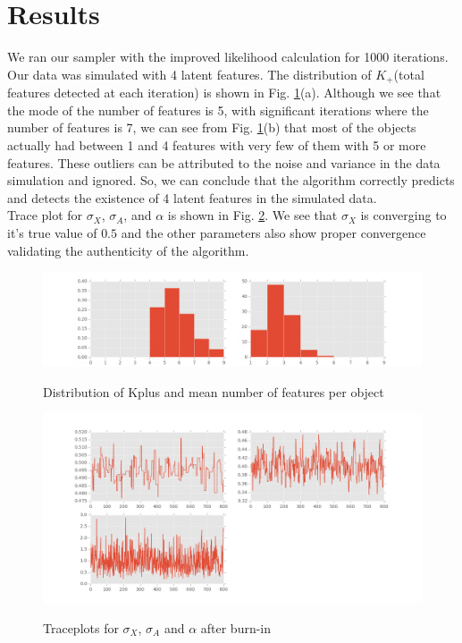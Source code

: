 \documentclass{article}
\begin{document}
\section{Results}
We ran our sampler with the improved likelihood calculation for 1000 iterations. Our data was simulated with 4 latent features. The distribution of $K_+$(total features detected at each iteration) is shown in Fig. \ref{fig:dist}(a). Although we see that the mode of the number of features is 5, with significant iterations where the number of features is 7, we can see from Fig. \ref{fig:dist}(b) that most of the objects actually had between 1 and 4 features with very few of them with 5 or more features. These outliers can be attributed to the noise and variance in the data simulation and ignored. So, we can conclude that the algorithm correctly predicts and detects the existence of 4 latent features in the simulated data.\\
Trace plot for $\sigma_X$, $\sigma_A$, and $\alpha$ is shown in Fig. \ref{fig:trace}. We see that $\sigma_X$ is converging to it's true value of $0.5$ and the other parameters also show proper convergence validating the authenticity of the algorithm.\\ 
\begin{figure}[ht]
\caption {Distribution of Kplus and mean number of features per object}
\includegraphics[width=\linewidth]{figures/kDistribution.png}
\label{fig:dist}
\end{figure}

\begin{figure}[ht]
\caption {Traceplots for $\sigma_X$, $\sigma_A$ and $\alpha$ after burn-in}
\includegraphics[width=\linewidth]{figures/Trace.png}
\label{fig:trace}
\end{figure}
\end{document}
